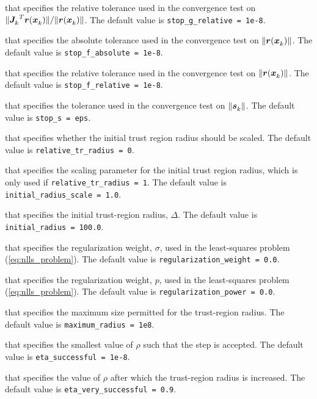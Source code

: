 \begin{description}
that specifies the relative tolerance used in the convergence test on \(\|{{\bm J}_{k}^{}}^T{\bm r}({\bm x}_{k}^{})\|/\|{\bm r}({\bm x}_{k}^{})\|\).
The default value is {\tt stop\_g\_relative = 1e{-8}}.

that specifies the absolute tolerance used in the convergence test on \(\|{\bm r}({\bm x}_{k}^{})\|\).
The default value is {\tt stop\_f\_absolute = 1e{-8}}.

that specifies the relative tolerance used in the convergence test on \(\|{\bm r}({\bm x}_{k}^{})\|\).
The default value is {\tt stop\_f\_relative = 1e{-8}}.

that specifies the tolerance used in the convergence test on \(\|{\bm s}_{k}^{}\|\).
The default value is {\tt stop\_s = eps}.

that specifies whether the initial trust region radius should be scaled.
The default value is {\tt relative\_tr\_radius = 0}.

that specifies the scaling parameter for the initial trust region radius, which is only used if {\tt relative\_tr\_radius = 1}.
The default value is {\tt initial\_radius\_scale = 1.0}.

that specifies the initial trust-region radius, $\Delta$.
The default value is {\tt initial\_radius = 100.0}.

that specifies the regularization weight, $\sigma$, used in the least-squares problem (\ref{eq:nlls_problem}).  
The default value is {\tt regularization\_weight = 0.0}.

that specifies the regularization weight, $p$, used in the least-squares problem (\ref{eq:nlls_problem}).  
The default value is {\tt regularization\_power = 0.0}.


that specifies the maximum size permitted for the trust-region radius.
The default value is {\tt maximum\_radius = 1e8}.

that specifies the smallest value of $\rho$ such that the step is accepted.
The default value is {\tt eta\_successful = 1e-8}.


that specifies the value of $\rho$ after which the trust-region radius is increased.
The default value is {\tt eta\_very\_successful = 0.9}.


\end{description}

